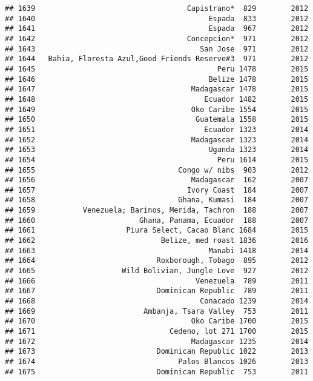 \documentclass[
]{article}
\begin{document}
\begin{verbatim}
## 1639                                   Capistrano*  829        2012
## 1640                                        Espada  833        2012
## 1641                                        Espada  967        2012
## 1642                                   Concepcion*  971        2012
## 1643                                      San Jose  971        2012
## 1644   Bahia, Floresta Azul,Good Friends Reserve#3  971        2012
## 1645                                          Peru 1478        2015
## 1646                                        Belize 1478        2015
## 1647                                    Madagascar 1478        2015
## 1648                                       Ecuador 1482        2015
## 1649                                    Oko Caribe 1554        2015
## 1650                                     Guatemala 1558        2015
## 1651                                       Ecuador 1323        2014
## 1652                                    Madagascar 1323        2014
## 1653                                        Uganda 1323        2014
## 1654                                          Peru 1614        2015
## 1655                                 Congo w/ nibs  903        2012
## 1656                                    Madagascar  162        2007
## 1657                                   Ivory Coast  184        2007
## 1658                                 Ghana, Kumasi  184        2007
## 1659           Venezuela; Barinos, Merida, Tachron  188        2007
## 1660                        Ghana, Panama, Ecuador  188        2007
## 1661                     Piura Select, Cacao Blanc 1684        2015
## 1662                             Belize, med roast 1836        2016
## 1663                                        Manabi 1418        2014
## 1664                            Roxborough, Tobago  895        2012
## 1665                    Wild Bolivian, Jungle Love  927        2012
## 1666                                     Venezuela  789        2011
## 1667                            Dominican Republic  789        2011
## 1668                                      Conacado 1239        2014
## 1669                         Ambanja, Tsara Valley  753        2011
## 1670                                    Oko Caribe 1700        2015
## 1671                               Cedeno, lot 271 1700        2015
## 1672                                    Madagascar 1235        2014
## 1673                            Dominican Republic 1022        2013
## 1674                                 Palos Blancos 1026        2013
## 1675                            Dominican Republic  753        2011

\end{verbatim}
\end{document}
